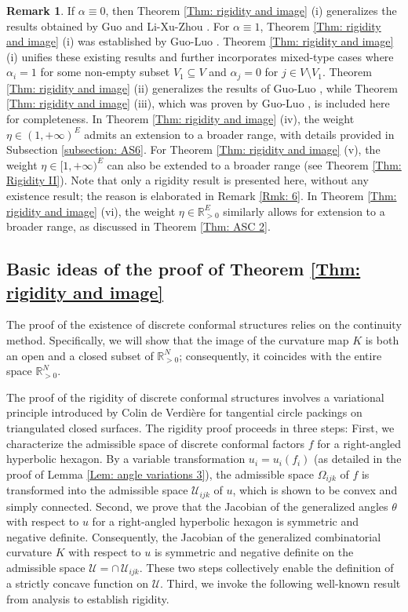 \documentclass[12pt]{amsart}
\theoremstyle{definition}
\newtheorem{remark}[theorem]{Remark}
\begin{document}
\begin{remark}
If $\alpha \equiv 0$, then Theorem \ref{Thm: rigidity and image} (i) generalizes the results obtained by Guo \cite{Guo} and Li-Xu-Zhou \cite{Li-Xu-Zhou}. 
For $\alpha \equiv 1$, Theorem \ref{Thm: rigidity and image} (i) was established by Guo-Luo \cite{GL2}. 
Theorem \ref{Thm: rigidity and image} (i) unifies these existing results and further incorporates mixed-type cases where $\alpha_i = 1$ for some non-empty subset $V_1 \subseteq V$ and $\alpha_j = 0$ for $j \in V \setminus V_1$.
Theorem \ref{Thm: rigidity and image} (ii) generalizes the results of Guo-Luo \cite{GL2}, while Theorem \ref{Thm: rigidity and image} (iii), which was proven by Guo-Luo \cite{GL2}, is included here for completeness.
In Theorem \ref{Thm: rigidity and image} (iv), the weight $\eta \in (1, +\infty)^E$ admits an extension to a broader range, with details provided in Subsection \ref{subsection: AS6}. 
For Theorem \ref{Thm: rigidity and image} (v), the weight $\eta \in [1, +\infty)^E$ can also be extended to a broader range (see Theorem \ref{Thm: Rigidity II}). 
Note that only a rigidity result is presented here, without any existence result; the reason is elaborated in Remark \ref{Rmk: 6}. 
In Theorem \ref{Thm: rigidity and image} (vi), the weight $\eta \in \mathbb{R}_{>0}^E$ similarly allows for extension to a broader range, as discussed in Theorem \ref{Thm: ASC 2}.
\end{remark}

\subsection{Basic ideas of the proof of Theorem \ref{Thm: rigidity and image}}\label{Subsec: 1}

The proof of the existence of discrete conformal structures relies on the continuity method. 
Specifically, we will show that the image of the curvature map $K$ is both an open and a closed subset of $\mathbb{R}^N_{>0}$; consequently, it coincides with the entire space $\mathbb{R}^N_{>0}$.

The proof of the rigidity of discrete conformal structures involves a variational principle introduced by Colin de Verdi\`{e}re \cite{De} for tangential circle packings on triangulated closed surfaces. 
The rigidity proof proceeds in three steps:
First, we characterize the admissible space of discrete conformal factors $f$ for a right-angled hyperbolic hexagon. 
By a variable transformation $u_i=u_i(f_i)$ (as detailed in the proof of Lemma \ref{Lem: angle variations 3}), the admissible space $\Omega_{ijk}$ of $f$ is transformed into the admissible space $\mathcal{U}_{ijk}$ of $u$, which is shown to be convex and simply connected.
Second, we prove that the Jacobian of the generalized angles $\theta$ with respect to $u$ for a right-angled hyperbolic hexagon is symmetric and negative definite.
Consequently, the Jacobian of the generalized combinatorial curvature $K$ with respect to $u$ is symmetric and negative definite on the admissible space $\mathcal{U}=\cap\, \mathcal{U}_{ijk}$.
These two steps collectively enable the definition of a strictly concave function on $\mathcal{U}$.
Third, we invoke the following well-known result from analysis to establish rigidity.
\end{document}
